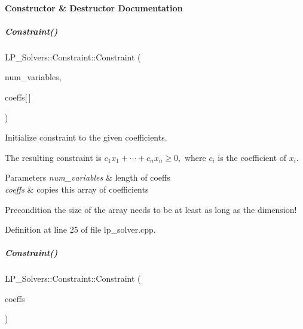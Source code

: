 \paragraph{Constructor \& Destructor Documentation}
\mbox{\label{group___c_l_s_solvers_a461ed6a3396f874d12b2aec6996180d9}} 
\subparagraph{\texorpdfstring{Constraint()}{Constraint()}\hspace{0.1cm}{\footnotesize\ttfamily [1/2]}}
{\footnotesize\ttfamily L\+P\+\_\+\+Solvers\+::\+Constraint\+::\+Constraint (\begin{DoxyParamCaption}\item[{N\+V\+A\+R\+\_\+\+T\+Y\+PE}]{num\+\_\+variables,  }\item[{C\+O\+N\+S\+T\+R\+\_\+\+T\+Y\+PE}]{coeffs\mbox{[}$\,$\mbox{]} }\end{DoxyParamCaption})}



Initialize constraint to the given coefficients. 

The resulting constraint is $ c_1x_1 + \cdots + c_nx_n \geq 0, $ where $ c_i $ is the coefficient of $ x_i $. 
\begin{DoxyParams}{Parameters}
{\em num\+\_\+variables} & length of coeffs \\
\hline
{\em coeffs} & copies this array of coefficients \\
\hline
\end{DoxyParams}
\begin{DoxyPrecond}{Precondition}
the size of the array needs to be at least as long as the dimension! 
\end{DoxyPrecond}


Definition at line 25 of file lp\+\_\+solver.\+cpp.

\mbox{\label{group___c_l_s_solvers_abc362e0473a75944d6b8830f6dc33846}} 
\subparagraph{\texorpdfstring{Constraint()}{Constraint()}\hspace{0.1cm}{\footnotesize\ttfamily [2/2]}}
{\footnotesize\ttfamily L\+P\+\_\+\+Solvers\+::\+Constraint\+::\+Constraint (\begin{DoxyParamCaption}\item[{vector$<$ C\+O\+N\+S\+T\+R\+\_\+\+T\+Y\+PE $>$ \&}]{coeffs }\end{DoxyParamCaption})}



